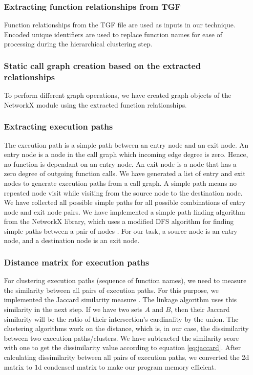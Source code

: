 \subsubsection{Extracting function relationships from TGF}

Function relationships from the TGF file are used as inputs in our technique. Encoded unique identifiers are used to replace function names for ease of processing during the hierarchical clustering step.

\subsubsection{Static call graph creation based on the extracted relationships}
To perform different graph operations, we have created graph objects of the NetworkX \cite{networkx} module using the extracted function relationships. 
\subsubsection{Extracting execution paths}

The execution path is a simple path between an entry node and an exit node. An entry node is a node in the call graph which incoming edge degree is zero. Hence, no function is dependant on an entry node. An exit node is a node that has a zero degree of outgoing function calls. We have generated a list of entry and exit nodes to generate execution paths from a call graph. A simple path means no repeated node visit while visiting from the source node to the destination node. We have collected all possible simple paths for all possible combinations of entry node and exit node pairs. We have implemented a simple path finding algorithm from the NetworkX library, which uses a modified DFS algorithm for finding simple paths between a pair of nodes \cite{networkx}. For our task, a source node is an entry node, and a destination node is an exit node.    

\subsubsection{Distance matrix for execution paths}

For clustering execution paths (sequence of function names), we need to measure the similarity between all pairs of execution paths. For this purpose, we implemented the Jaccard similarity measure \cite{niwattanakul2013jaccardKeywordsSimilarity}. The linkage algorithm uses this similarity in the next step. If we have two sets $ A $ and $ B $, then their Jaccard similarity will be the ratio of their intersection's cardinality by the union. The clustering algorithms work on the distance, which is, in our case, the dissimilarity between two execution paths/clusters. We have subtracted the similarity score with one to get the dissimilarity value according to equation \ref{eq:jaccard}. After calculating dissimilarity between all pairs of execution paths, we converted the 2d matrix to 1d condensed matrix to make our program memory efficient.

